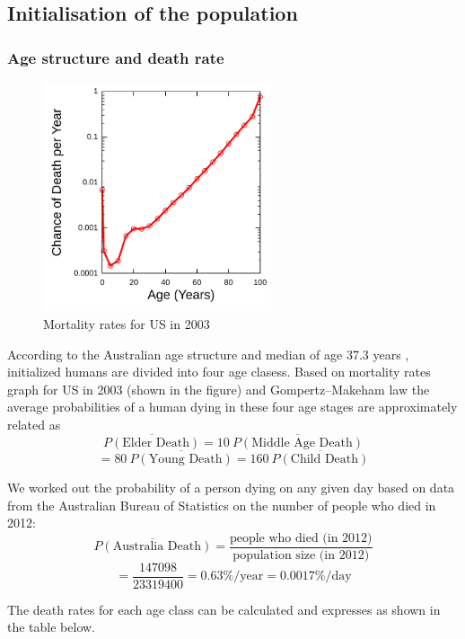 \documentclass[a4paper]{article}
\newcommand*\mean[1]{\overline{#1}}
\begin{document}
\subsection{Initialisation of the population}

\subsubsection{Age structure and death rate}

\begin{figure}[ht]
    \centering
    \includegraphics[width=0.6\textwidth]{USGompertzCurve}
    \caption{Mortality rates for US in 2003}
\end{figure}

According to the Australian age structure\cite{agestructure} and median of age 37.3 years \cite{demographicsaustralia}, initialized humans are divided into four age clasess.
Based on mortality rates graph for US in 2003 (shown in the figure) and Gompertz–Makeham law \cite{mortalitylaw} the average probabilities of a human dying in these four age stages are approximately related as 
$$ \mean{P(\text{Elder Death})} = 10\: \mean{P(\text{Middle Age Death})} $$
$$ = 80\: \mean{P(\text{Young Death})} = 160\: \mean{P(\text{Child Death})} $$

We worked out the probability of a person dying on any given day based on data from the Australian Bureau of Statistics on the number of people who died in 2012\cite{absdeath}:
$$ \mean{P(\text{Australia Death})} = \frac{\text{people who died (in 2012)}}{\text{population size (in 2012)}} $$
$$ = \frac{147098}{23319400} = 0.63\%/\text{year} = 0.0017\%/\text{day} $$

The death rates for each age class can be calculated and expresses as shown in the table below.
\end{document}
